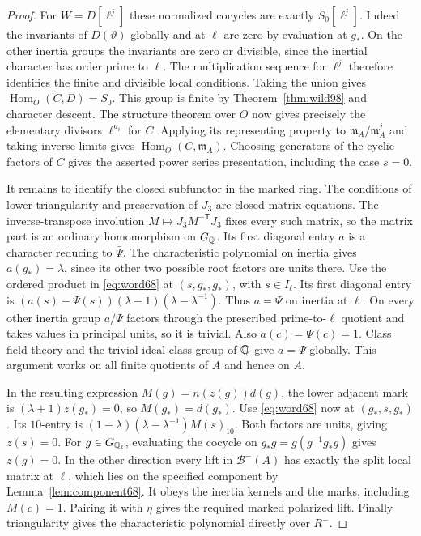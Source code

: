 \documentclass[a4paper,11pt]{article}
\theoremstyle{definition}
\theoremstyle{remark}
\numberwithin{equation}{section}
\begin{document}
\begin{proof}
For \(W=D[\ell^j]\) these normalized cocycles are exactly
\(S_0[\ell^j]\). Indeed the invariants of \(D(\vartheta)\) globally
and at \(\ell\) are zero by evaluation at \(g_*\). On the other
inertia groups the invariants are zero or divisible, since the
inertial character has order prime to \(\ell\). The multiplication
sequence for \(\ell^j\) therefore identifies the finite and
divisible local conditions. Taking the union gives
\(\operatorname{Hom}_O(C,D)=S_0\). This group is finite by
Theorem~\ref{thm:wild98} and character descent. The structure
theorem over \(O\) now gives precisely the elementary divisors
\(\ell^{a_i}\) for \(C\). Applying its representing property to
\(\mathfrak m_A/\mathfrak m_A^j\) and taking inverse limits gives
\(\operatorname{Hom}_O(C,\mathfrak m_A)\). Choosing generators
of the cyclic factors of \(C\) gives the asserted power series
presentation, including the case \(s=0\).

It remains to identify the closed subfunctor in the marked ring.
The conditions of lower triangularity and preservation of \(J_3\)
are closed matrix equations. The inverse-transpose involution
\(M\mapsto J_3 M^{-\mathsf T}J_3\) fixes every such matrix, so
the matrix part is an ordinary homomorphism on \(G_\mathbb Q\).
Its first diagonal entry \(a\) is a character reducing to
\(\bar\Psi\). The characteristic polynomial on inertia gives
\(a(g_*)=\lambda\), since its other two possible root factors
are units there. Use the ordered product in \eqref{eq:word68} at
\((s,g_*,g_*)\), with \(s\in I_\ell\). Its first diagonal entry is
\((a(s)-\Psi(s))(\lambda-1)(\lambda-\lambda^{-1})\). Thus
\(a=\Psi\) on inertia at \(\ell\). On every other inertia group
\(a/\Psi\) factors through the prescribed prime-to-\(\ell\)
quotient and takes values in principal units, so it is trivial.
Also \(a(c)=\Psi(c)=1\). Class field theory and the trivial ideal
class group of \(\mathbb Q\) give \(a=\Psi\) globally. This argument
works on all finite quotients of \(A\) and hence on \(A\).

In the resulting expression \(M(g)=n(z(g))d(g)\), the lower
adjacent mark is \((\lambda+1)z(g_*)=0\), so \(M(g_*)=d(g_*)\).
Use \eqref{eq:word68} now at \((g_*,s,g_*)\). Its \(10\)-entry
is \((1-\lambda)(\lambda-\lambda^{-1})M(s)_{10}\).
Both factors are units, giving \(z(s)=0\). For
\(g\in G_{\mathbb Q_\ell}\), evaluating the cocycle on
\(g_*g=g(g^{-1}g_*g)\) gives \(z(g)=0\). In the other direction
every lift in \(\mathcal B^-(A)\) has exactly the split local
matrix at \(\ell\), which lies on the specified component by
Lemma~\ref{lem:component68}. It obeys the inertia kernels and
the marks, including \(M(c)=1\). Pairing it with \(\eta\) gives
the required marked polarized lift. Finally triangularity gives
the characteristic polynomial directly over \(R^-\).
\end{proof}
\end{document}

